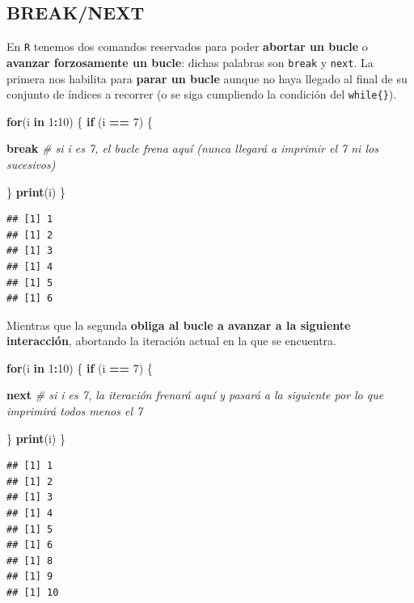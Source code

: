 \documentclass[11pt,]{book}
\newenvironment{Shaded}{\begin{snugshade}}{\end{snugshade}}
\newcommand{\CommentTok}[1]{\textcolor[rgb]{0.37,0.37,0.37}{\textit{#1}}}
\newcommand{\ControlFlowTok}[1]{\textcolor[rgb]{0.27,0.27,0.27}{\textbf{#1}}}
\newcommand{\DecValTok}[1]{\textcolor[rgb]{0.06,0.06,0.06}{#1}}
\newcommand{\KeywordTok}[1]{\textcolor[rgb]{0.27,0.27,0.27}{\textbf{#1}}}
\newcommand{\NormalTok}[1]{#1}
\newcommand{\OperatorTok}[1]{\textcolor[rgb]{0.43,0.43,0.43}{\textbf{#1}}}
\newcommand{\StringTok}[1]{\textcolor[rgb]{0.5,0.5,0.5}{#1}}
\begin{document}
\hypertarget{breaknext}{%
\subsection{BREAK/NEXT}\label{breaknext}}

En \texttt{R} tenemos dos comandos reservados para poder \textbf{abortar un bucle} o \textbf{avanzar forzosamente un bucle}: dichas palabras son \texttt{break} y \texttt{next}. La primera nos habilita para \textbf{parar un bucle} aunque no haya llegado al final de su conjunto de índices a recorrer (o se siga cumpliendo la condición del \texttt{while\{\}}).

\begin{Shaded}
\begin{Highlighting}[]
\ControlFlowTok{for}\NormalTok{(i }\ControlFlowTok{in} \DecValTok{1}\OperatorTok{:}\DecValTok{10}\NormalTok{) \{}
  \ControlFlowTok{if}\NormalTok{ (i }\OperatorTok{==}\StringTok{ }\DecValTok{7}\NormalTok{) \{}
    
    \ControlFlowTok{break} \CommentTok{# si i es 7, el bucle frena aquí (nunca llegará a imprimir el 7 ni los sucesivos)}
    
\NormalTok{  \}}
  \KeywordTok{print}\NormalTok{(i)}
\NormalTok{\}}
\end{Highlighting}
\end{Shaded}

\begin{verbatim}
## [1] 1
## [1] 2
## [1] 3
## [1] 4
## [1] 5
## [1] 6
\end{verbatim}

Mientras que la segunda \textbf{obliga al bucle a avanzar a la siguiente interacción}, abortando la iteración actual en la que se encuentra.

\begin{Shaded}
\begin{Highlighting}[]
\ControlFlowTok{for}\NormalTok{(i }\ControlFlowTok{in} \DecValTok{1}\OperatorTok{:}\DecValTok{10}\NormalTok{) \{}
  \ControlFlowTok{if}\NormalTok{ (i }\OperatorTok{==}\StringTok{ }\DecValTok{7}\NormalTok{) \{}
    
    \ControlFlowTok{next} \CommentTok{# si i es 7, la iteración frenará aquí y pasará a la siguiente por lo que imprimirá todos menos el 7}
    
\NormalTok{  \}}
  \KeywordTok{print}\NormalTok{(i)}
\NormalTok{\}}
\end{Highlighting}
\end{Shaded}

\begin{verbatim}
## [1] 1
## [1] 2
## [1] 3
## [1] 4
## [1] 5
## [1] 6
## [1] 8
## [1] 9
## [1] 10
\end{verbatim}
\end{document}
